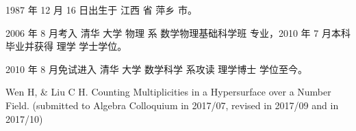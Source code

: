 \begin{resume}


  1987 年 12 月 16 日出生于 江西 省 萍乡 市。

  2006 年 8 月考入 清华 大学 物理 系 数学物理基础科学班 专业，2010 年 7 月本科毕业并获得 理学 学士学位。

  2010 年 8 月免试进入 清华 大学 数学科学 系攻读 理学博士 学位至今。

\begin{publications}
\item Wen H, \& Liu C H. Counting Multiplicities in a Hypersurface over a Number Field. (submitted to Algebra Colloquium in 2017/07, revised in 2017/09 and in 2017/10)
\end{publications}





\end{resume}
